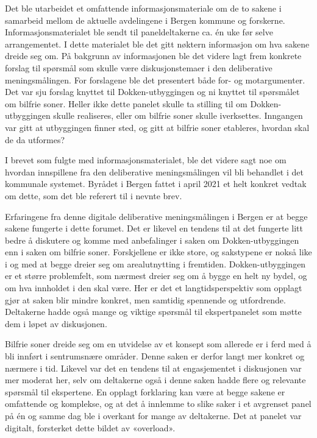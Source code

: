 \documentclass[
  12pt,
  a4paper, 12pt]{article}
\begin{document}
Det ble utarbeidet et omfattende informasjonsmateriale om de to sakene i samarbeid mellom de aktuelle avdelingene i Bergen kommune og forskerne. Informasjonsmaterialet ble sendt til paneldeltakerne ca. én uke før selve arrangementet. I dette materialet ble det gitt nøktern informasjon om hva sakene dreide seg om. På bakgrunn av informasjonen ble det videre lagt frem konkrete forslag til spørsmål som skulle være diskusjonstemaer i den deliberative meningsmålingen. For forslagene ble det presentert både for- og motargumenter. Det var sju forslag knyttet til Dokken-utbyggingen og ni knyttet til spørsmålet om bilfrie soner. Heller ikke dette panelet skulle ta stilling til om Dokken-utbyggingen skulle realiseres, eller om bilfrie soner skulle iverksettes. Inngangen var gitt at utbyggingen finner sted, og gitt at bilfrie soner etableres, hvordan skal de da utformes?

I brevet som fulgte med informasjonsmaterialet, ble det videre sagt noe om hvordan innspillene fra den deliberative meningsmålingen vil bli behandlet i det kommunale systemet. Byrådet i Bergen fattet i april 2021 et helt konkret vedtak om dette, som det ble referert til i nevnte brev.

Erfaringene fra denne digitale deliberative meningsmålingen i Bergen er at begge sakene fungerte i dette forumet. Det er likevel en tendens til at det fungerte litt bedre å diskutere og komme med anbefalinger i saken om Dokken-utbyggingen enn i saken om bilfrie soner. Forskjellene er ikke store, og sakstypene er nokså like i og med at begge dreier seg om arealutnytting i fremtiden. Dokken-utbyggingen er et større problemfelt, som nærmest dreier seg om å bygge en helt ny bydel, og om hva innholdet i den skal være. Her er det et langtidsperspektiv som opplagt gjør at saken blir mindre konkret, men samtidig spennende og utfordrende. Deltakerne hadde også mange og viktige spørsmål til ekspertpanelet som møtte dem i løpet av diskusjonen.

Bilfrie soner dreide seg om en utvidelse av et konsept som allerede er i ferd med å bli innført i sentrumsnære områder. Denne saken er derfor langt mer konkret og nærmere i tid. Likevel var det en tendens til at engasjementet i diskusjonen var mer moderat her, selv om deltakerne også i denne saken hadde flere og relevante spørsmål til ekspertene. En opplagt forklaring kan være at begge sakene er omfattende og komplekse, og at det å innlemme to slike saker i et avgrenset panel på én og samme dag ble i overkant for mange av deltakerne. Det at panelet var digitalt, forsterket dette bildet av «overload».
\end{document}
